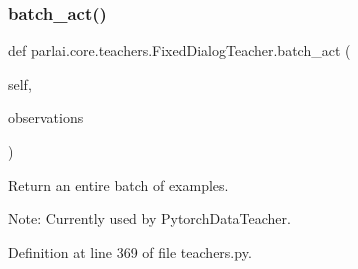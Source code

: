 \subsubsection{\texorpdfstring{batch\+\_\+act()}{batch\_act()}}
{\footnotesize\ttfamily def parlai.\+core.\+teachers.\+Fixed\+Dialog\+Teacher.\+batch\+\_\+act (\begin{DoxyParamCaption}\item[{}]{self,  }\item[{}]{observations }\end{DoxyParamCaption})}

\begin{DoxyVerb}Return an entire batch of examples.

Note: Currently used by PytorchDataTeacher.
\end{DoxyVerb}
 

Definition at line 369 of file teachers.\+py.


